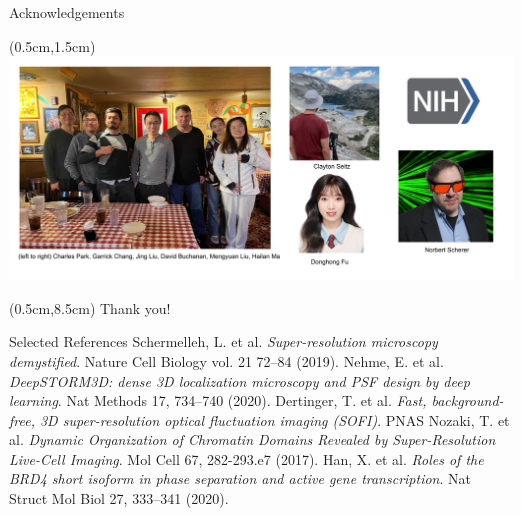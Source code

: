 \documentclass{beamer}					%
\begin{document}
\begin{frame}{Acknowledgements}
\begin{textblock*}{14cm}(0.5cm,1.5cm)
\includegraphics[width=14cm]{Lab.png}
\end{textblock*}

\begin{textblock*}{14cm}(0.5cm,8.5cm)
Thank you!
\end{textblock*}

\end{frame}
\begin{frame}{Selected References}
\noindent [1] Schermelleh, L. et al. \textit{Super-resolution microscopy demystified}. Nature Cell Biology vol. 21 72–84 (2019). 
\newline
\noindent [2] Nehme, E. et al. \textit{DeepSTORM3D: dense 3D localization microscopy and PSF design by deep learning}. Nat Methods 17, 734–740 (2020). 
\newline
\noindent [3] Dertinger, T. et al. \textit{Fast, background-free, 3D super-resolution optical fluctuation imaging (SOFI)}. PNAS
\newline
\noindent [4] Nozaki, T. et al. \textit{Dynamic Organization of Chromatin Domains Revealed by Super-Resolution Live-Cell Imaging}. Mol Cell 67, 282-293.e7 (2017). 
\newline
\noindent [5] Han, X. et al.\textit{ Roles of the BRD4 short isoform in phase separation and active gene transcription}. Nat Struct Mol Biol 27, 333–341 (2020). 
\newline
\end{frame}
\end{document}
